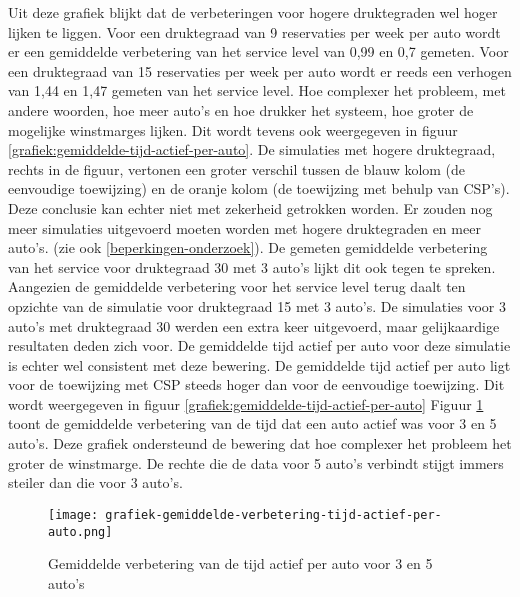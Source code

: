 Uit deze grafiek blijkt dat de verbeteringen voor hogere druktegraden wel hoger lijken te liggen. Voor een druktegraad van 9 reservaties per week per auto wordt er een gemiddelde verbetering van het service level van 0,99 en 0,7 gemeten. Voor een druktegraad van 15 reservaties per week per auto wordt er reeds een verhogen van 1,44 en 1,47 gemeten van het service level. Hoe complexer het probleem, met andere woorden, hoe meer auto's en hoe drukker het systeem, hoe groter de mogelijke winstmarges lijken. Dit wordt tevens ook weergegeven in figuur \ref{grafiek:gemiddelde-tijd-actief-per-auto}. De simulaties met hogere druktegraad, rechts in de figuur, vertonen een groter verschil tussen de blauw kolom (de eenvoudige toewijzing) en de oranje kolom (de toewijzing met behulp van CSP's). Deze conclusie kan echter niet met zekerheid getrokken worden. Er zouden nog meer simulaties uitgevoerd moeten worden met hogere druktegraden en meer auto's. (zie ook \ref{beperkingen-onderzoek}). De gemeten gemiddelde verbetering van het service voor druktegraad 30 met 3 auto's lijkt dit ook tegen te spreken. Aangezien de gemiddelde verbetering voor het service level terug daalt ten opzichte van de simulatie voor druktegraad 15 met 3 auto's. De simulaties voor 3 auto's met druktegraad 30 werden een extra keer uitgevoerd, maar gelijkaardige resultaten deden zich voor. De gemiddelde tijd actief per auto voor deze simulatie is echter wel consistent met deze bewering. 
De gemiddelde tijd actief per auto ligt voor de toewijzing met CSP steeds hoger dan voor de eenvoudige toewijzing. Dit wordt weergegeven in figuur \ref{grafiek:gemiddelde-tijd-actief-per-auto} 
Figuur \ref{grafiek:gemiddelde-verbetering-tijd-actief} toont de gemiddelde verbetering van de tijd dat een auto actief was voor 3 en 5 auto's. Deze grafiek ondersteund de bewering dat hoe complexer het probleem het groter de winstmarge. De rechte die de data voor 5 auto's verbindt stijgt immers steiler dan die voor 3 auto's.
\begin{figure}[h]
	\texttt{[image: grafiek-gemiddelde-verbetering-tijd-actief-per-auto.png]}
	\caption[Grafiek van de gemiddelde verbetering van de tijd actief per auto]{Gemiddelde verbetering van de tijd actief per auto voor 3 en 5 auto's}
	\label{grafiek:gemiddelde-verbetering-tijd-actief}
\end{figure}

